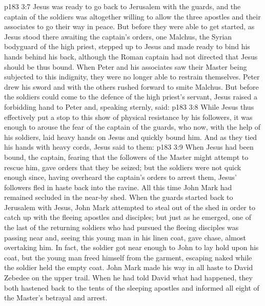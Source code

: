 \vs p183 3:7 Jesus was ready to go back to Jerusalem with the guards, and the captain of the soldiers was altogether willing to allow the three apostles and their associates to go their way in peace. But before they were able to get started, as Jesus stood there awaiting the captain’s orders, one Malchus, the Syrian bodyguard of the high priest, stepped up to Jesus and made ready to bind his hands behind his back, although the Roman captain had not directed that Jesus should be thus bound. When Peter and his associates saw their Master being subjected to this indignity, they were no longer able to restrain themselves. Peter drew his sword and with the others rushed forward to smite Malchus. But before the soldiers could come to the defence of the high priest’s servant, Jesus raised a forbidding hand to Peter and, speaking sternly, said: 
\vs p183 3:8 While Jesus thus effectively put a stop to this show of physical resistance by his followers, it was enough to arouse the fear of the captain of the guards, who now, with the help of his soldiers, laid heavy hands on Jesus and quickly bound him. And as they tied his hands with heavy cords, Jesus said to them: 
\vs p183 3:9 When Jesus had been bound, the captain, fearing that the followers of the Master might attempt to rescue him, gave orders that they be seized; but the soldiers were not quick enough since, having overheard the captain’s orders to arrest them, Jesus’ followers fled in haste back into the ravine. All this time John Mark had remained secluded in the near\hyp{}by shed. When the guards started back to Jerusalem with Jesus, John Mark attempted to steal out of the shed in order to catch up with the fleeing apostles and disciples; but just as he emerged, one of the last of the returning soldiers who had pursued the fleeing disciples was passing near and, seeing this young man in his linen coat, gave chase, almost overtaking him. In fact, the soldier got near enough to John to lay hold upon his coat, but the young man freed himself from the garment, escaping naked while the soldier held the empty coat. John Mark made his way in all haste to David Zebedee on the upper trail. When he had told David what had happened, they both hastened back to the tents of the sleeping apostles and informed all eight of the Master’s betrayal and arrest.
